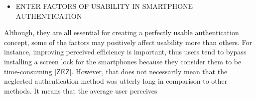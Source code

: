 \begin{itemize}
    \item ENTER FACTORS OF USABILITY IN SMARTPHONE AUTHENTICATION
\end{itemize}

Although, they are all essential for creating a perfectly usable authentication concept, some of the factors may positively affect usability more than others. For instance, improving perceived efficiency is important, thus users tend to bypass installing a screen lock for the smartphones because they consider them to be time-consuming [ZEZ].  
However, that does not necessarily mean that the neglected authentication method was utterly long in comparison to other methods. It means that the average user perceives 



 

